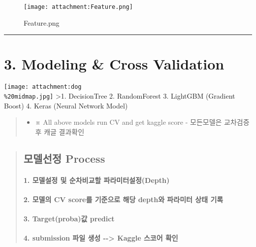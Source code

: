 \documentclass[11pt]{article}
\makeatletter
\def\maxwidth{\ifdim\Gin@nat@width>\linewidth\linewidth
    \else\Gin@nat@width\fi}
\let\Oldincludegraphics\includegraphics
\renewcommand{\includegraphics}[1]{\Oldincludegraphics[width=.8\maxwidth]{#1}}
\providecommand{\tightlist}{%
      \setlength{\itemsep}{0pt}\setlength{\parskip}{0pt}}
\makeatother
\begin{document}
\begin{figure}
\centering
\texttt{[image: attachment:Feature.png]}
\caption{Feature.png}
\end{figure}

    \begin{center}\rule{0.5\linewidth}{\linethickness}\end{center}

\section{3. Modeling \& Cross
Validation}\label{modeling-cross-validation}

\texttt{[image: attachment:dog\\\%20midmap.jpg]} \textgreater{}1.
DecisionTree 2. RandomForest 3. LightGBM (Gradient Boost) 4. Keras
(Neural Network Model)

\begin{quote}
\begin{itemize}
\tightlist
\item
  ※ All above models run CV and get kaggle score - 모든모델은 교차검증
  후 캐글 결과확인
\end{itemize}
\end{quote}

    \begin{quote}
\subsection{모델선정 Process}\label{uxbaa8uxb378uxc120uxc815-process}

\mbox{}%
\paragraph{1. 모델설정 및 순차비교할
파라미터설정(Depth)}\label{uxbaa8uxb378uxc124uxc815-uxbc0f-uxc21cuxcc28uxbe44uxad50uxd560-uxd30cuxb77cuxbbf8uxd130uxc124uxc815depth}

\mbox{}%
\paragraph{2. 모델의 CV score를 기준으로 해당 depth와 파라미터 상태
기록}\label{uxbaa8uxb378uxc758-cv-scoreuxb97c-uxae30uxc900uxc73cuxb85c-uxd574uxb2f9-depthuxc640-uxd30cuxb77cuxbbf8uxd130-uxc0c1uxd0dc-uxae30uxb85d}

\mbox{}%
\paragraph{3. Target(proba)값 predict}\label{targetprobauxac12-predict}

\mbox{}%
\paragraph{4. submission 파일 생성 -\/-\textgreater{} Kaggle 스코어
확인}\label{submission-uxd30cuxc77c-uxc0dduxc131----kaggle-uxc2a4uxcf54uxc5b4-uxd655uxc778}
\end{quote}
\end{document}
